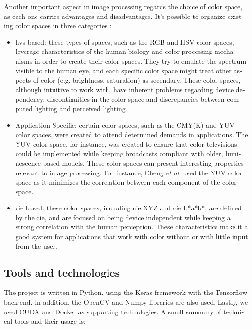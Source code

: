 \documentclass[12pt,openright,oneside,a4paper,english]{abntex2}
\begin{document}
\begin{otherlanguage}{english}
    Another important aspect in image processing regards the choice of color space, as each one carries advantages and disadvantages. It's possible to organize existing color spaces in three categories \cite{colorspace}:
    \begin{itemize}
        \item \acrshort{hvs} based: these types of spaces, such as the RGB and HSV color spaces, leverage characteristics of the human biology and color processing mechanisms in order to create their color spaces. They  try to emulate the spectrum visible to the human eye, and each specific color space might treat other aspects of color (e.g. brightness, saturation) as secondary. These color spaces, although intuitive to work with, have inherent problems regarding device dependency, discontinuities in the color space and discrepancies between computed lighting and perceived lighting.
        \item Application Specific: certain color spaces, such as the CMY(K) and YUV color spaces, were created to attend determined demands in applications. The YUV color space, for instance, was created to ensure that color televisions could be implemented while keeping broadcasts compliant with older, luminescence-based models. These color spaces can present interesting properties relevant to image processing. For instance, Cheng \textit{et al.} \cite{Cheng2015} used the YUV color space as it minimizes the correlation between each component of the color space.
        \item  \acrshort{cie} based: these color spaces, including \acrshort{cie} XYZ and \acrshort{cie} L*a*b*, are defined by the \acrfull{cie},  and are focused on being device independent while keeping a strong correlation with the human perception. These characteristics make it a good system for applications that work with color without or with little input from the user.
    \end{itemize}

    \subsection{Tools and technologies}
    The project is written in Python, using the Keras framework with the Tensorflow back-end. In addition, the OpenCV and Numpy libraries are also used. Lastly, we used CUDA and Docker as supporting technologies. A small summary of technical tools and their usage is:


\end{otherlanguage}
\end{document}
